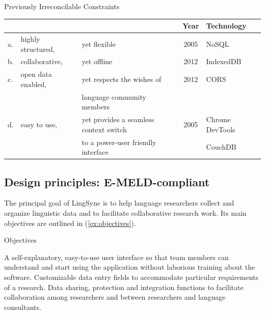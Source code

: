 \documentclass[letterpaper, 12pt, dvips]{mitwpl}
\begin{document}

\begin{exe}
\ex  Previously Irreconcilable Constraints

\hspace{-.4in}
\begin{tabular}{lllcl}
&& & Year & Technology \\\hline\hline
a. & highly structured, & yet flexible & 2005 & NoSQL\\\hline
b. & collaborative, & yet offline  & 2012 &  IndexedDB\\\hline
c. & open data enabled,  &yet respects the wishes of & 2012 & CORS \\
&&   language community members \\\hline
d. & easy to use,  &yet provides a seamless context switch  & 2005 & Chrome DevTools  \\
&& to a power-user friendly interface && CouchDB
\end{tabular}
\label{ex:Irreconcilable}
\end{exe}



\subsection{Design principles: E-MELD-compliant} 
\label{sec:design}

The principal goal of LingSync is to help language researchers collect and organize linguistic data and to facilitate collaborative research work. Its main objectives are outlined in (\ref{ex:objectives}).

\begin{exe} 
\ex Objectives

\begin{xlist}
        \ex  A self-explanatory, easy-to-use user interface so that team members can understand and start using the application without laborious training about the software.
        \ex Customizable data entry fields to accommodate particular requirements of a research.  
        \ex  Data sharing, protection and integration functions to facilitate collaboration among researchers and between researchers and language consultants. 
    \end{xlist}
\label{ex:objectives}
\end{exe}
\end{document}
